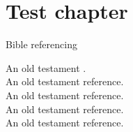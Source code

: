 \documentclass[twoside,14pt,onecolumn,openright ,a4paper]{memoir}
\begin{document}
        \chapter{Test chapter}
            \beginnumbering
            \pstart
            \lipsum[1]
         Bible referencing 
        \lipsum[1]
        \pend

            \pstart 
        \lipsum[1]


            An old testament  .\\
            An old testament reference.\\
            An old testament reference.\\
            An old testament reference.\\
            An old testament reference.\\
            \lipsum[1]
            \pend
            \endnumbering

            \backmatter
            \printindex[bible]
        
\end{document}
